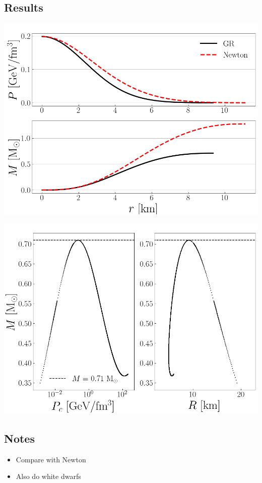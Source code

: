\documentclass[twocolumn]{article}
\begin{document}
\begin{large}
\subsection*{Results}
\begin{center}
    \includegraphics[scale=0.35]{Newt.png}
\end{center}
\begin{center}
    \includegraphics[scale=0.35]{TOV_limit.png}
\end{center}



\subsection*{Notes}
\begin{itemize}
    \item Compare with Newton
    \item Also do white dwarfs
\end{itemize}




\end{large}
\end{document}
